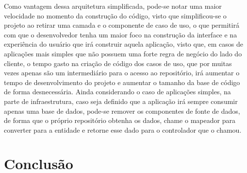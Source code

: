 \documentclass[12pt, %
openright, 
oneside, %
a4paper,    %
brazil]{facom-ufu-abntex2}
\begin{document}
Como vantagem dessa arquitetura simplificada, pode-se notar uma maior velocidade no momento da construção do código, visto que simplificou-se o projeto ao retirar uma camada e o componente de caso de uso, o que permitirá com que o desenvolvedor tenha um maior foco na construção da interface e na experiência do usuário que irá construir aquela aplicação, visto que, em casos de aplicações mais simples que não possuem uma forte regra de negócio do lado do cliente, o tempo gasto na criação de código dos casos de uso, que por muitas vezes apenas são um intermediário para o acesso ao repositório, irá aumentar o tempo de desenvolvimento do projeto e aumentar o tamanho da base de código de forma desnecessária. Ainda considerando o caso de aplicações simples, na parte de infraestrutura, caso seja definido que a aplicação irá sempre consumir apenas uma base de dados, pode-se remover os componentes de fonte de dados, de forma que o próprio repositório obtenha os dados, chame o mapeador para converter para a entidade e retorne esse dado para o controlador que o chamou.

\chapter{Conclusão}

\postextual



\end{document}
